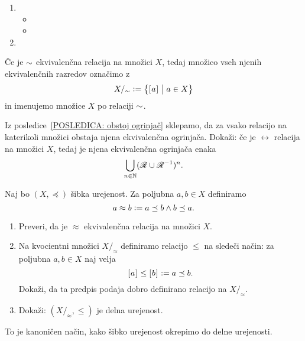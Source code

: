                 \begin{dokaz}
                        \begin{enumerate}
                                \item
                                        \begin{itemize}
                                                \item{}
                                                \item{}
                                        \end{itemize}
                                \item
                        \end{enumerate}
                \end{dokaz}

                Če je $\sim$ ekvivalenčna relacija na množici $X$, tedaj množico vseh njenih ekvivalenčnih razredov označimo z
                \[X/_\equ \dfeq \set[1]{\ec{a}}{a \in X}\]
                in imenujemo  množice $X$ po relaciji $\sim$.


                \begin{vaja}
                        Iz posledice~\ref{POSLEDICA: obstoj ogrinjač} sklepamo, da za vsako relacijo na katerikoli množici obstaja njena ekvivalenčna ogrinjača. Dokaži: če je $\rel$ relacija na množici $X$, tedaj je njena ekvivalenčna ogrinjača enaka
                        \[\bigcup_{n \in \NN} (\rel \cup \rel^{-1})^n.\]
                \end{vaja}

                \begin{vaja}
                        Naj bo $(X, \preceq)$ šibka urejenost. Za poljubna $a, b \in X$ definiramo
                        \[a \approx b \mathrel{\mathop:}= a \preceq b \land b \preceq a.\]
                        \begin{enumerate}
                                \item
                                        Preveri, da je $\approx$ ekvivalenčna relacija na množici $X$.
                                \item
                                        Na kvocientni množici $X/_\approx$ definiramo relacijo $\leq$ na sledeči način: za poljubna $a, b \in X$ naj velja
                                        \[[\:\!{a}\:\!]_{} \leq [\:\!{b}\:\!]_{} \mathrel{\mathop:}= a \preceq b.\]
                                        Dokaži, da ta predpis podaja dobro definirano relacijo na $X/_\approx$.
                                \item
                                        Dokaži: $(X/_\approx, \leq)$ je delna urejenost.
                        \end{enumerate}
                        To je kanoničen način, kako šibko urejenost okrepimo do delne urejenosti.
                \end{vaja}

